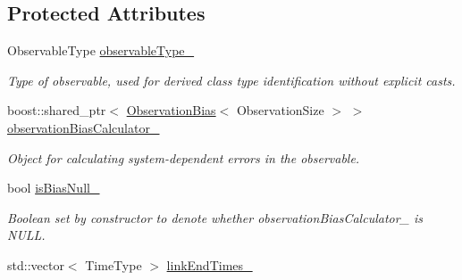 \subsection*{Protected Attributes}
\begin{DoxyCompactItemize}
\item 
Observable\+Type \hyperlink{classtudat_1_1observation__models_1_1ObservationModel_a087a9b8ab47d7599787d537d4796dc45}{observable\+Type\+\_\+}\hypertarget{classtudat_1_1observation__models_1_1ObservationModel_a087a9b8ab47d7599787d537d4796dc45}{}\label{classtudat_1_1observation__models_1_1ObservationModel_a087a9b8ab47d7599787d537d4796dc45}

\begin{DoxyCompactList}\small\item\em Type of observable, used for derived class type identification without explicit casts. \end{DoxyCompactList}\item 
boost\+::shared\+\_\+ptr$<$ \hyperlink{classtudat_1_1observation__models_1_1ObservationBias}{Observation\+Bias}$<$ Observation\+Size $>$ $>$ \hyperlink{classtudat_1_1observation__models_1_1ObservationModel_a361d74a8660b2462ed7cc98c50b2ed3d}{observation\+Bias\+Calculator\+\_\+}
\begin{DoxyCompactList}\small\item\em Object for calculating system-\/dependent errors in the observable. \end{DoxyCompactList}\item 
bool \hyperlink{classtudat_1_1observation__models_1_1ObservationModel_a007dfc516d3ebd1edc3a901ea089f895}{is\+Bias\+Null\+\_\+}\hypertarget{classtudat_1_1observation__models_1_1ObservationModel_a007dfc516d3ebd1edc3a901ea089f895}{}\label{classtudat_1_1observation__models_1_1ObservationModel_a007dfc516d3ebd1edc3a901ea089f895}

\begin{DoxyCompactList}\small\item\em Boolean set by constructor to denote whether observation\+Bias\+Calculator\+\_\+ is N\+U\+LL. \end{DoxyCompactList}\item 
std\+::vector$<$ Time\+Type $>$ \hyperlink{classtudat_1_1observation__models_1_1ObservationModel_acd85588f95a8b9f649fcf105e44f8c9b}{link\+End\+Times\+\_\+}\hypertarget{classtudat_1_1observation__models_1_1ObservationModel_acd85588f95a8b9f649fcf105e44f8c9b}{}\label{classtudat_1_1observation__models_1_1ObservationModel_acd85588f95a8b9f649fcf105e44f8c9b}


\end{DoxyCompactItemize}
